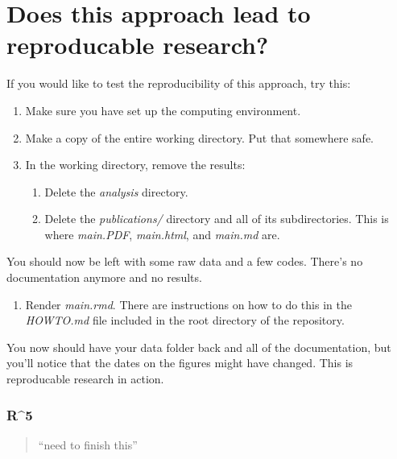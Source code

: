 \documentclass[11pt,]{article}
\providecommand{\tightlist}{%
  \setlength{\itemsep}{0pt}\setlength{\parskip}{0pt}}
\begin{document}
\hypertarget{does-this-approach-lead-to-reproducable-research}{%
\section{Does this approach lead to reproducable research?}\label{does-this-approach-lead-to-reproducable-research}}

If you would like to test the reproducibility of this approach, try this:

\begin{enumerate}
\def\labelenumi{\arabic{enumi}.}
\tightlist
\item
  Make sure you have set up the computing environment.
\item
  Make a copy of the entire working directory. Put that somewhere safe.
\item
  In the working directory, remove the results:

  \begin{enumerate}
  \def\labelenumii{\arabic{enumii}.}
  \tightlist
  \item
    Delete the \emph{analysis} directory.
  \item
    Delete the \emph{publications/} directory and all of its subdirectories. This is where \emph{main.PDF}, \emph{main.html}, and \emph{main.md} are.
  \end{enumerate}
\end{enumerate}

You should now be left with some raw data and a few codes. There's no documentation anymore and no results.

\begin{enumerate}
\def\labelenumi{\arabic{enumi}.}
\setcounter{enumi}{4}
\tightlist
\item
  Render \emph{main.rmd}. There are instructions on how to do this in the \emph{HOWTO.md} file included in the root directory of the repository.
\end{enumerate}

You now should have your data folder back and all of the documentation, but you'll notice that the dates on the figures might have changed. This is reproducable research in action.

\hypertarget{r5}{%
\subsubsection{R\^{}5}\label{r5}}

\begin{quote}
``need to finish this''
\end{quote}
\end{document}
